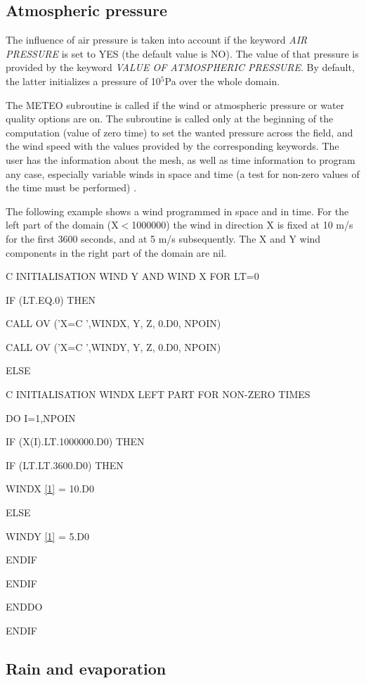 \subsection{ Atmospheric pressure}

 The influence of air pressure is taken into account if the keyword \textit{AIR PRESSURE} is set to YES (the default value is NO). The value of that pressure is provided by the keyword \textit{VALUE OF ATMOSPHERIC PRESSURE}. By default, the latter initializes a pressure of 10${}^{5}$Pa over the whole domain.

 The METEO subroutine is called if the wind or atmospheric pressure or water quality options are on. The subroutine is called only at the beginning of the computation (value of zero time) to set the wanted pressure across the field, and the wind speed with the values {}{}provided by the corresponding keywords. The user has the information about the mesh, as well as time information to program any case, especially variable winds in space and time (a test for non-zero values {}{}of the time must be performed) .

 The following example shows a wind programmed in space and in time. For the left part of the domain (X$<$1000000) the wind in direction X is fixed at 10 m/s for the first 3600 seconds, and at 5 m/s subsequently. The X and Y wind components in the right part of the domain are nil.



 C INITIALISATION WIND Y AND WIND X FOR LT=0

  IF (LT.EQ.0) THEN

    CALL OV ('X=C     ',WINDX, Y, Z, 0.D0, NPOIN)

    CALL OV ('X=C     ',WINDY, Y, Z, 0.D0, NPOIN)

  ELSE

 C INITIALISATION WINDX LEFT PART FOR NON-ZERO TIMES

    DO I=1,NPOIN

      IF (X(I).LT.1000000.D0) THEN

   IF (LT.LT.3600.D0) THEN

     WINDX \eqref{1} = 10.D0

   ELSE

     WINDY \eqref{1} = 5.D0

   ENDIF

       ENDIF

         ENDDO

   ENDIF


\subsection{ Rain and evaporation}

